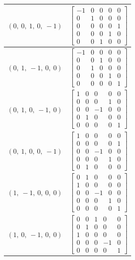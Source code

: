\documentclass[11pt]{article}
\theoremstyle{definition}
\begin{document}
\begin{longtable}{|l|c|}
    \hline
    $\left( 0, \  0, \  1, \  0, \  -1\right)$ & ${\left[\begin{matrix}-1 & 0 & 0 & 0 & 0\\0 & 1 & 0 & 0 & 0\\0 & 0 & 0 & 0 & 1\\0 & 0 & 0 & 1 & 0\\0 & 0 & 1 & 0 & 0\end{matrix}\right]}$ \\
    \hline
    $\left( 0, \  1, \  -1, \  0, \  0\right)$ & ${\left[\begin{matrix}-1 & 0 & 0 & 0 & 0\\0 & 0 & 1 & 0 & 0\\0 & 1 & 0 & 0 & 0\\0 & 0 & 0 & 1 & 0\\0 & 0 & 0 & 0 & 1\end{matrix}\right]}$ \\
    \hline
    $\left( 0, \  1, \  0, \  -1, \  0\right)$ & ${\left[\begin{matrix}1 & 0 & 0 & 0 & 0\\0 & 0 & 0 & 1 & 0\\0 & 0 & -1 & 0 & 0\\0 & 1 & 0 & 0 & 0\\0 & 0 & 0 & 0 & 1\end{matrix}\right]}$ \\
    \hline
    $\left( 0, \  1, \  0, \  0, \  -1\right)$ & ${\left[\begin{matrix}1 & 0 & 0 & 0 & 0\\0 & 0 & 0 & 0 & 1\\0 & 0 & -1 & 0 & 0\\0 & 0 & 0 & 1 & 0\\0 & 1 & 0 & 0 & 0\end{matrix}\right]}$ \\
    \hline
    $\left( 1, \  -1, \  0, \  0, \  0\right)$ & ${\left[\begin{matrix}0 & 1 & 0 & 0 & 0\\1 & 0 & 0 & 0 & 0\\0 & 0 & -1 & 0 & 0\\0 & 0 & 0 & 1 & 0\\0 & 0 & 0 & 0 & 1\end{matrix}\right]}$ \\
    \hline
    $\left( 1, \  0, \  -1, \  0, \  0\right)$ & ${\left[\begin{matrix}0 & 0 & 1 & 0 & 0\\0 & 1 & 0 & 0 & 0\\1 & 0 & 0 & 0 & 0\\0 & 0 & 0 & -1 & 0\\0 & 0 & 0 & 0 & 1\end{matrix}\right]}$ \\

\end{longtable}
\end{document}
